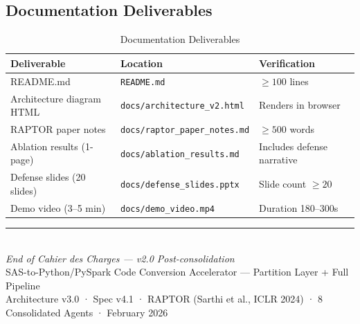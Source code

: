 \documentclass[11pt,a4paper]{article}
\begin{document}
\subsection{Documentation Deliverables}

\begin{table}[H]
\centering
\caption{Documentation Deliverables}
\renewcommand{\arraystretch}{1.25}
\small
\begin{tabularx}{\textwidth}{@{} L{4cm} l X @{}}
\toprule
\textbf{Deliverable} & \textbf{Location} & \textbf{Verification} \\
\midrule
README.md & \texttt{README.md} & $\geq 100$ lines \\
Architecture diagram HTML & \texttt{docs/architecture\_v2.html} & Renders in browser \\
RAPTOR paper notes & \texttt{docs/raptor\_paper\_notes.md} & $\geq 500$ words \\
Ablation results (1-page) & \texttt{docs/ablation\_results.md} & Includes defense narrative \\
Defense slides (20 slides) & \texttt{docs/defense\_slides.pptx} & Slide count $\geq 20$ \\
Demo video (3–5 min) & \texttt{docs/demo\_video.mp4} & Duration 180–300s \\
\bottomrule
\end{tabularx}
\end{table}

\vfill
\begin{center}
\textcolor{accent}{\rule{0.4\textwidth}{0.4pt}}\\[8pt]
\textit{End of Cahier des Charges — v2.0 Post-consolidation}\\[4pt]
\small\textcolor{primary}{SAS-to-Python/PySpark Code Conversion Accelerator — Partition Layer + Full Pipeline}\\[4pt]
\small\textcolor{primary}{Architecture v3.0 · Spec v4.1 · RAPTOR (Sarthi et al., ICLR 2024) · 8 Consolidated Agents · February 2026}
\end{center}
\end{document}
